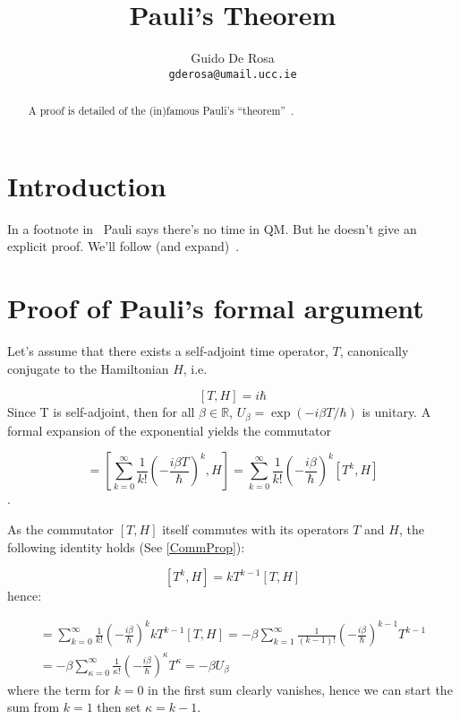 \documentclass[a4paper,12pt]{article}
\author{Guido De Rosa \\ \small\tt{gderosa@umail.ucc.ie}}
\title{Pauli's Theorem}
\begin{document}
\maketitle

\begin{abstract}
A proof is detailed of the (in)famous Pauli's ``theorem''~\cite[footnote~2]{PauliFootnote}.
\end{abstract}

\section{Introduction}

In a footnote in~\cite{PauliFootnote} Pauli says there's no time in QM. But he
doesn't give an explicit proof. We'll follow (and expand)~\cite{Galapon2002}.

\section{Proof of Pauli's formal argument}\label{proof}

Let's assume that there exists a self-adjoint time operator, $T$, canonically conjugate
to the Hamiltonian $H$, i.e.

\begin{equation}
\label{THcommutator}
[T, H] = i\hbar
\end{equation}
Since T is self-adjoint, then for all
$\beta\in\mathbb{R}$, $U_{\beta} = \exp(- i \beta T / \hbar)$
is unitary. A formal
expansion of the exponential yields the commutator

\begin{equation}
[U_{\beta}, H]  = 
\left[
    \sum_{k=0}^{\infty} \frac{1}{k!} \left(- \frac{i\beta T}{\hbar} \right)^k, H
\right]         =
\sum_{k=0}^{\infty} \frac{1}{k!} \left(- \frac{i\beta}{\hbar} \right)^k [T^k, H]
\end{equation}.

As the commutator $[T, H]$ itself commutes with its operators $T$ and $H$,
the following identity holds (See \ref{CommProp}):

$$
[T^k, H] = kT^{k-1}[T, H]
$$
hence:

\begin{multline}
[U_{\beta}, H]  = 
\sum_{k=0}^{\infty} \frac{1}{k!} \left(- \frac{i\beta}{\hbar} \right)^k kT^{k-1}[T, H] =
-\beta\sum_{k=1}^{\infty} \frac{1}{(k-1)!} \left(- \frac{i\beta}{\hbar} \right)^{k-1} T^{k-1} \\ =
-\beta\sum_{\kappa=0}^{\infty} \frac{1}{\kappa!} \left(- \frac{i\beta}{\hbar} \right)^{\kappa} T^{\kappa} =
-\beta U_{\beta}
\end{multline}
where the term for $k=0$ in the first sum clearly vanishes, hence we can start the sum from 
$k=1$ then set $\kappa=k-1$.
\end{document}

